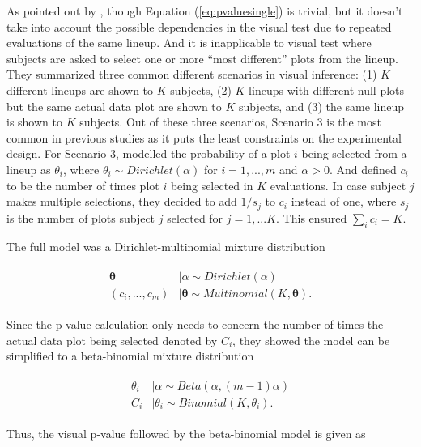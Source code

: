 \documentclass[]{interact}
\theoremstyle{plain}%
\theoremstyle{definition}
\theoremstyle{remark}
\begin{document}
As pointed out by \citet{vanderplas2021statistical}, though Equation
(\ref{eq:pvaluesingle}) is trivial, but it doesn't take into account the
possible dependencies in the visual test due to repeated evaluations of
the same lineup. And it is inapplicable to visual test where subjects
are asked to select one or more ``most different'' plots from the
lineup. They summarized three common different scenarios in visual
inference: (1) \(K\) different lineups are shown to \(K\) subjects, (2)
\(K\) lineups with different null plots but the same actual data plot
are shown to \(K\) subjects, and (3) the same lineup is shown to \(K\)
subjects. Out of these three scenarios, Scenario 3 is the most common in
previous studies as it puts the least constraints on the experimental
design. For Scenario 3, \citet{vanderplas2021statistical} modelled the
probability of a plot \(i\) being selected from a lineup as
\(\theta_i\), where \(\theta_i \sim Dirichlet(\alpha)\) for
\(i=1,...,m\) and \(\alpha > 0\). And defined \(c_i\) to be the number
of times plot \(i\) being selected in \(K\) evaluations. In case subject
\(j\) makes multiple selections, they decided to add \(1/s_j\) to
\(c_i\) instead of one, where \(s_j\) is the number of plots subject
\(j\) selected for \(j=1,...K\). This ensured \(\sum_{i}c_i=K\).

The full model was a Dirichlet-multinomial mixture distribution

\begin{align} \label{eq:dirichlet-multinomial}\begin{split}
\boldsymbol{\theta}&|\alpha \sim Dirichlet(\alpha)\\
(c_i,...,c_m)&|\boldsymbol{\theta} \sim Multinomial(K, \boldsymbol{\theta}).
\end{split}\end{align}

Since the p-value calculation only needs to concern the number of times
the actual data plot being selected denoted by \(C_i\), they showed the
model can be simplified to a beta-binomial mixture distribution

\begin{align} \label{eq:beta-binomial}\begin{split}
\theta_i&|\alpha \sim Beta(\alpha, (m-1)\alpha)\\
C_i&|\theta_i \sim Binomial(K, \theta_i).
\end{split}\end{align}

Thus, the visual p-value followed by the beta-binomial model is given as
\end{document}
